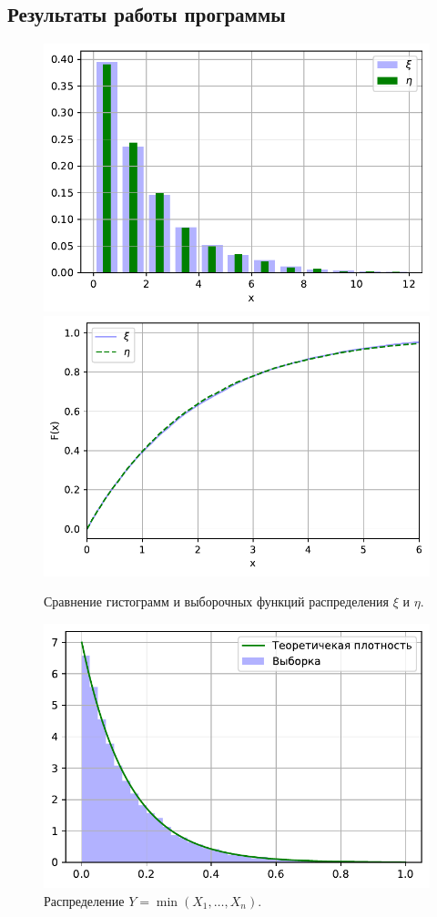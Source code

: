 \documentclass[16pt]{article}
\begin{document}
\subsection{Результаты работы программы}
\begin{figure}[h]
	\center
    \includegraphics[scale=0.5]{3_1.pdf}
    \hfill
    \includegraphics[scale=0.5]{3_2.pdf}
    \caption{Сравнение гистограмм и выборочных функций распределения $\xi$ и $\eta$.}
\end{figure}

\begin{figure}[h]
	\center
	\includegraphics[scale=0.7]{3_3.pdf}
	\caption{Распределение $Y = \min(X_1, \ldots, X_n)$.}
\end{figure}
\end{document}

